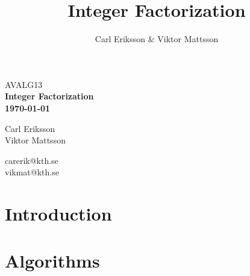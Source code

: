 \documentclass[a4paper,12pt]{article}
\author{Carl Eriksson & Viktor Mattsson}
\begin{document}
\title{Integer Factorization}
    
	\begin{titlepage}
    	\centering
    	\small
    	AVALG13\\
    	\vspace*{6\baselineskip}
    	\Large
    	\bfseries
    	Integer Factorization\\
    	\normalsize
        \textbf{\today} \\[2\baselineskip]

        \begin{minipage}{0.4\textwidth}
        \begin{flushleft} 
        Carl Eriksson\\
        Viktor Mattsson\\
        \end{flushleft}
        \end{minipage}
        \begin{minipage}{0.25\textwidth}
        \begin{flushleft} 
        carerik@kth.se\\
        vikmat@kth.se\\
        \end{flushleft}
        \end{minipage}

        \vspace*{10\baselineskip}
    \end{titlepage}

    \newpage

    \tableofcontents

    \newpage

    \section{Introduction}
        

    \section{Algorithms}
        




\end{document}
